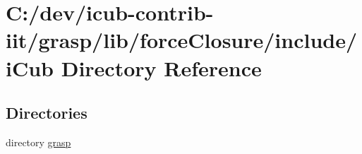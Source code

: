 \section{C\+:/dev/icub-\/contrib-\/iit/grasp/lib/force\+Closure/include/i\+Cub Directory Reference}
\label{dir_d8af5f1d61678bce81c720d012e4681b}
\subsection*{Directories}
\begin{DoxyCompactItemize}
\item 
directory \hyperlink{dir_eae50eed8301c2785c3d11a02f513153}{grasp}
\end{DoxyCompactItemize}
